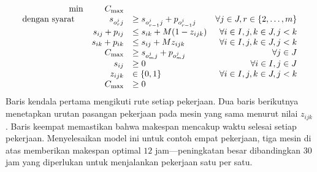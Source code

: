 \begin{subequations}
\begin{equation}
\begin{array}{rrlr}
\min
               & C_{\max} \\
\mbox{dengan syarat}\quad
&            s_{o^{j}_{r}j} &  \geq s_{o^{j}_{r-1}j} +p_{o^{j}_{r-1}j} & \forall j \in {J}, r \in \{2,\dots,m\} \\
             &      s_{ij} + p_{ij}     & \leq s_{ik} + M (1-z_{ijk}) & \forall i \in {I}, j,k \in {J}, j < k \\
              &     s_{ik} + p_{ik}     & \leq s_{ij} + M z_{ijk} & \forall i \in {I}, j,k \in {J}, j < k \\
            &       C_{\max}          & \geq s_{o^{j}_{m}j} + p_{o^{j}_{m}j} & \forall j \in {J} \\
            &      s_{ij}      & \geq 0 & \forall i \in {I}, j \in {J} \\
           &       z_{ijk}     & \in \{0,1\} & \forall i \in {I}, j,k \in {J}, j < k \\
          &        C_{\max} & \geq 0
              \end{array}
              \end{equation}
\end{subequations}
Baris kendala pertama mengikuti rute setiap pekerjaan. Dua baris berikutnya menetapkan urutan pasangan pekerjaan pada mesin yang sama menurut nilai $z_{ijk}$. Baris keempat memastikan bahwa makespan mencakup waktu selesai setiap pekerjaan.
Menyelesaikan model ini untuk contoh empat pekerjaan, tiga mesin di atas memberikan makespan optimal $12$ jam---peningkatan besar dibandingkan $30$ jam yang diperlukan untuk menjalankan pekerjaan satu per satu.
